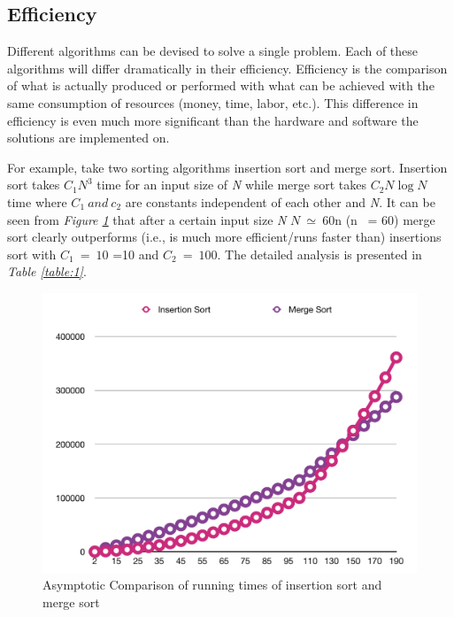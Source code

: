 \documentclass[12pt,a4paper]{book}
\begin{document}
\subsection{Efficiency}
Different algorithms can be devised to solve a single problem. Each of these algorithms will differ dramatically in their efficiency. Efficiency is the comparison of what is actually produced or performed with what can be achieved with the same consumption of resources (money, time, labor, etc.). This difference in efficiency is even much more significant than the hardware and software the solutions are implemented on.
\par For example, take two sorting algorithms insertion sort and merge sort. Insertion sort takes $C_{1}N^{3}$ time for an input size of \textit{N} while merge sort takes $C_{2}N\log{N}$ time where $C_{1}\ and\ c_{2}$ are constants independent of each other and \textit{N}. It can be seen from \textit{Figure \ref{fig:efficiency1}} that after a certain input size \textit{N} $N\ \simeq\ 60$n (n ~= 60) merge sort clearly outperforms (i.e., is much more efficient/runs faster than) insertions sort with $C_{1}\ =\ 10$ =10 and $C_{2}\ =\ 100$. The detailed analysis is presented in \textit{Table \ref{table:1}}.
\begin{figure}[h]
    \centering
    \label{fig:efficiency1}
    \includegraphics[width=\textwidth]{efficiency}
    \caption{Asymptotic Comparison of running times of insertion sort and merge sort}
    
\end{figure}
\end{document}
